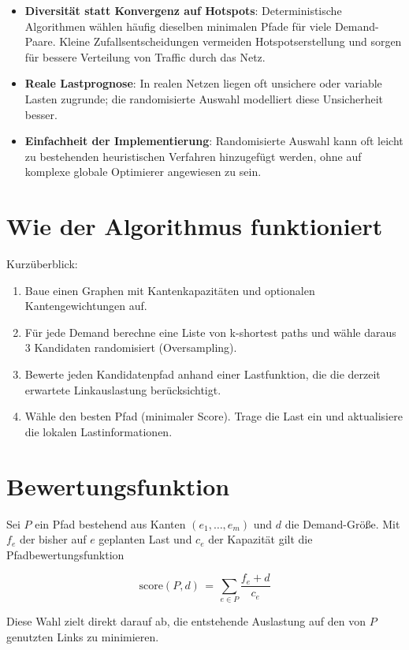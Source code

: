 \begin{itemize}
    \item \textbf{Diversität statt Konvergenz auf Hotspots}: Deterministische Algorithmen wählen häufig dieselben minimalen Pfade für viele Demand-Paare. Kleine Zufallsentscheidungen vermeiden Hotspotserstellung und sorgen für bessere Verteilung von Traffic durch das Netz.
    \item \textbf{Reale Lastprognose}: In realen Netzen liegen oft unsichere oder variable Lasten zugrunde; die randomisierte Auswahl modelliert diese Unsicherheit besser.
    \item \textbf{Einfachheit der Implementierung}: Randomisierte Auswahl kann oft leicht zu bestehenden heuristischen Verfahren hinzugefügt werden, ohne auf komplexe globale Optimierer angewiesen zu sein.
\end{itemize}

\section{Wie der Algorithmus funktioniert}

Kurzüberblick:

\begin{enumerate}
    \item Baue einen Graphen mit Kantenkapazitäten und optionalen Kantengewichtungen auf.
    \item Für jede Demand berechne eine Liste von k-shortest paths und wähle daraus 3 Kandidaten randomisiert (Oversampling).
    \item Bewerte jeden Kandidatenpfad anhand einer Lastfunktion, die die derzeit erwartete Linkauslastung berücksichtigt.
    \item Wähle den besten Pfad (minimaler Score). Trage die Last ein und aktualisiere die lokalen Lastinformationen.
\end{enumerate}

\section{Bewertungsfunktion}
Sei $P$ ein Pfad bestehend aus Kanten $(e_1,\dots,e_m)$ und $d$ die Demand-Größe. Mit $f_e$ der bisher auf $e$ geplanten Last und $c_e$ der Kapazität gilt die Pfadbewertungsfunktion

$$
\mathrm{score}(P,d) \,=\, \sum_{e\in P} \frac{f_e + d}{c_e}
$$

Diese Wahl zielt direkt darauf ab, die entstehende Auslastung auf den von $P$ genutzten Links zu minimieren.


